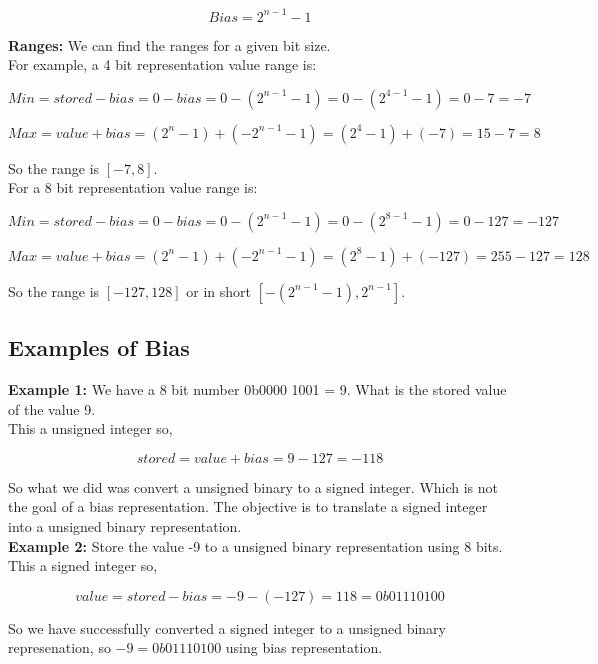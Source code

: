 \documentclass{article}
\begin{document}
\[
Bias = 2^{n-1} - 1
\]

\noindent \textbf{Ranges:} We can find the ranges for a given bit size. \\

\noindent For example, a 4 bit representation value range is:

\[
Min = stored - bias = 0 - bias = 0 - (2^{n-1} - 1) = 0 - (2^{4-1} - 1) = 0 - 7 = -7
\]

\[
Max = value + bias = (2^{n} - 1) + (-2^{n-1} - 1) = (2^{4} - 1) + (-7) = 15 - 7 = 8
\]

\noindent So the range is $[-7,8]$. \\

\noindent For a 8 bit representation value range is:

\[
Min = stored - bias = 0 - bias = 0 - (2^{n-1} - 1) = 0 - (2^{8-1} - 1) = 0 - 127 = -127
\]

\[
Max = value + bias = (2^{n} - 1) + (-2^{n-1} - 1) = (2^{8} - 1) + (-127) = 255 - 127 = 128
\]

\noindent So the range is $[-127,128]$ or in short $[-(2^{n-1} - 1), 2^{n-1}]$. \\

\subsection*{Examples of Bias}

\textbf{Example 1:} We have a 8 bit number 0b0000 1001 = 9. What is the stored value of the value 9. \\

This a unsigned integer so, 

\[
stored = value + bias = 9 - 127 = -118
\]

So what we did was convert a unsigned binary to a signed integer. Which is not the goal of a bias representation. The 
objective is to translate a signed integer into a unsigned binary representation. \\

\noindent \textbf{Example 2:} Store the value -9 to a unsigned binary representation using 8 bits. \\ 

This a signed integer so, 

\[
value = stored - bias = -9 -(-127) = 118 = 0b0111 0100
\]

So we have successfully converted a signed integer to a unsigned binary represenation, so $-9 = 0b0111 0100$ using bias 
representation. \\
\end{document}
